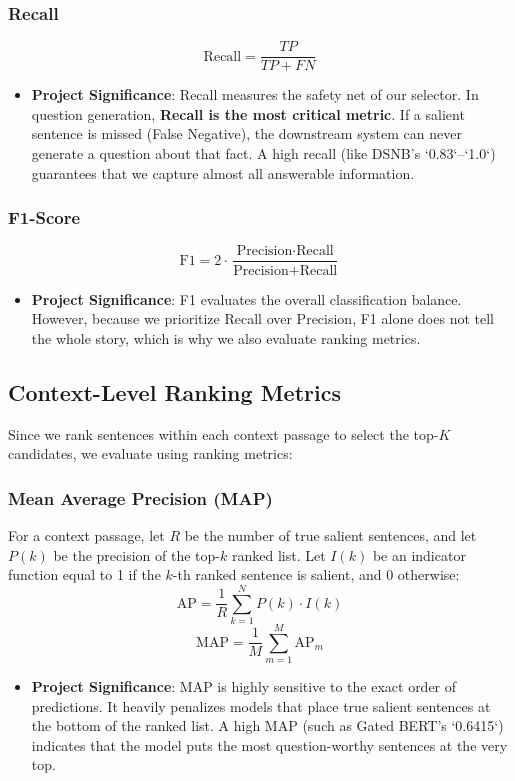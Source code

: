 \documentclass[11pt,a4paper]{article}
\begin{document}
\subsubsection{Recall}
\[
\text{Recall} = \frac{TP}{TP + FN}
\]
\begin{itemize}
    \item \textbf{Project Significance}: Recall measures the safety net of our selector. In question generation, \textbf{Recall is the most critical metric}. If a salient sentence is missed (False Negative), the downstream system can never generate a question about that fact. A high recall (like DSNB's `0.83`–`1.0`) guarantees that we capture almost all answerable information.
\end{itemize}

\subsubsection{F1-Score}
\[
\text{F1} = 2 \cdot \frac{\text{Precision} \cdot \text{Recall}}{\text{Precision} + \text{Recall}}
\]
\begin{itemize}
    \item \textbf{Project Significance}: F1 evaluates the overall classification balance. However, because we prioritize Recall over Precision, F1 alone does not tell the whole story, which is why we also evaluate ranking metrics.
\end{itemize}

\subsection{Context-Level Ranking Metrics}

Since we rank sentences within each context passage to select the top-$K$ candidates, we evaluate using ranking metrics:

\subsubsection{Mean Average Precision (MAP)}
For a context passage, let $R$ be the number of true salient sentences, and let $P(k)$ be the precision of the top-$k$ ranked list. Let $I(k)$ be an indicator function equal to 1 if the $k$-th ranked sentence is salient, and 0 otherwise:
\[
\text{AP} = \frac{1}{R} \sum_{k=1}^N P(k) \cdot I(k)
\]
\[
\text{MAP} = \frac{1}{M} \sum_{m=1}^M \text{AP}_m
\]
\begin{itemize}
    \item \textbf{Project Significance}: MAP is highly sensitive to the exact order of predictions. It heavily penalizes models that place true salient sentences at the bottom of the ranked list. A high MAP (such as Gated BERT's `0.6415`) indicates that the model puts the most question-worthy sentences at the very top.
\end{itemize}
\end{document}
